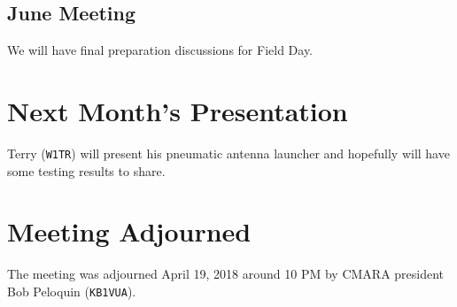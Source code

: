 \documentclass[10pt,letterpaper]{article}
\begin{document}
\subsection{June Meeting}
We will have final preparation discussions for Field Day.

\section{Next Month's Presentation}
Terry (\texttt{W1TR}) will present his pneumatic antenna launcher and hopefully will have some testing results to share.

\section{Meeting Adjourned}
The meeting was adjourned April 19, 2018 around 10 PM by CMARA president Bob Peloquin (\texttt{KB1VUA}).
\end{document}
